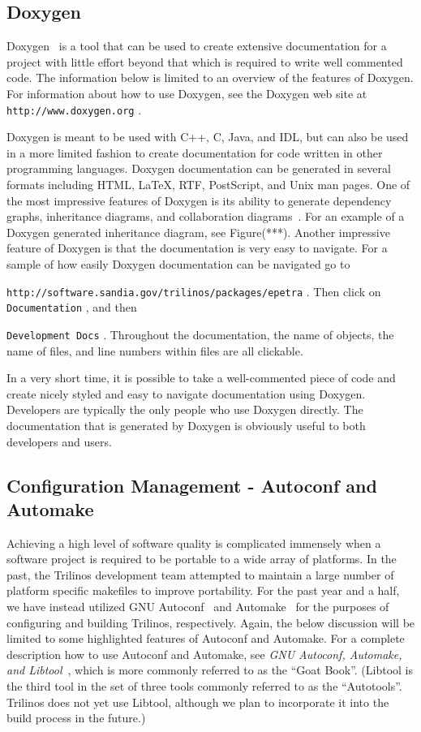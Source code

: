 \documentclass[12pt,relax]{article}
\newcommand{\InlineDirectory}[1]{
  {\hspace{0.01 in}} {\tt #1} {\hspace{0.01 in}}}
\begin{document}
\subsection{Doxygen}

Doxygen~\cite{Doxygen} is a tool that can be used to create 
extensive documentation for a project with little effort beyond that which is 
required to write well commented code.  The information below is limited 
to an overview of the features of Doxygen.  For information about how to use 
Doxygen, see the Doxygen 
web site at \InlineDirectory{http://www.doxygen.org}.  

Doxygen is meant to be used with C++, C, Java, and IDL, but can also be used 
in a more limited fashion to create documentation for code written in other
programming languages.  Doxygen documentation 
can be generated in several formats including HTML, LaTeX, RTF, PostScript, and
Unix man pages.  One of the most impressive features of Doxygen is its ability 
to generate dependency graphs, inheritance diagrams, and collaboration 
diagrams~\cite{Doxygen}.  For an example of a Doxygen generated inheritance 
diagram, see Figure(***).  Another impressive feature of Doxygen is that the 
documentation is very easy to navigate.  For a sample of how easily Doxygen 
documentation can be navigated go to
\newline
\InlineDirectory{http://software.sandia.gov/trilinos/packages/epetra}.  Then
click on \InlineDirectory{Documentation}, and then 
\InlineDirectory{Development Docs}. 
Throughout the documentation, the name of objects, 
the name of files, and line numbers within files are all clickable.

In a very short time, it is possible to take a well-commented piece of code 
and create nicely styled and easy to navigate documentation using Doxygen.
Developers are typically the only people who use Doxygen directly.  The 
documentation that is generated by Doxygen is obviously useful to both 
developers and users.

\subsection{Configuration Management - Autoconf and Automake}

Achieving a high level of software quality is complicated immensely when 
a software project is required to be portable to a wide array of platforms.
In the past, the Trilinos development team attempted to maintain a large 
number of platform specific makefiles to improve portability.  For the past 
year and a half, we have instead utilized GNU Autoconf~\cite{Autoconf} and 
Automake~\cite{Automake} for 
the purposes of configuring and building Trilinos, respectively.  Again, 
the below discussion will be limited to some highlighted features of Autoconf 
and Automake.  
For a complete description how to use Autoconf and Automake, see 
{\it GNU Autoconf, Automake, and Libtool}~\cite{GoatBook}, which is 
more commonly referred to as the ``Goat Book''.  (Libtool is the third tool 
in the set of three tools commonly referred to as the ``Autotools''.  Trilinos 
does not yet use Libtool, although we plan to incorporate it into the build 
process in the future.)
\end{document}
